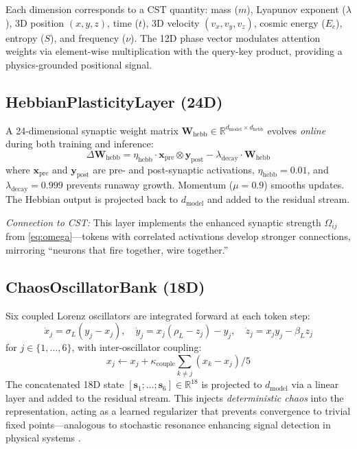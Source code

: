 \documentclass[11pt,a4paper]{article}
\begin{document}
Each dimension corresponds to a CST quantity: mass ($m$), Lyapunov exponent ($\lambda$), 3D position $(x,y,z)$, time ($t$), 3D velocity $(v_x, v_y, v_z)$, cosmic energy ($E_c$), entropy ($S$), and frequency ($\nu$). The 12D phase vector modulates attention weights via element-wise multiplication with the query-key product, providing a physics-grounded positional signal.

\subsection{HebbianPlasticityLayer (24D)}
\label{sec:hebbian}

A 24-dimensional synaptic weight matrix $\mathbf{W}_{\text{hebb}} \in \mathbb{R}^{d_{\text{model}} \times d_{\text{hebb}}}$ evolves \emph{online} during both training and inference:
\begin{equation}
    \Delta \mathbf{W}_{\text{hebb}} = \eta_{\text{hebb}} \cdot \mathbf{x}_{\text{pre}} \otimes \mathbf{y}_{\text{post}} - \lambda_{\text{decay}} \cdot \mathbf{W}_{\text{hebb}}
    \label{eq:hebb-update}
\end{equation}
where $\mathbf{x}_{\text{pre}}$ and $\mathbf{y}_{\text{post}}$ are pre- and post-synaptic activations, $\eta_{\text{hebb}} = 0.01$, and $\lambda_{\text{decay}} = 0.999$ prevents runaway growth. Momentum ($\mu = 0.9$) smooths updates. The Hebbian output is projected back to $d_{\text{model}}$ and added to the residual stream.

\emph{Connection to CST:} This layer implements the enhanced synaptic strength $\Omega_{ij}$ from \cref{eq:omega}---tokens with correlated activations develop stronger connections, mirroring ``neurons that fire together, wire together.''

\subsection{ChaosOscillatorBank (18D)}
\label{sec:chaos}

Six coupled Lorenz oscillators are integrated forward at each token step:
\begin{equation}
    \dot{x}_j = \sigma_L(y_j - x_j), \quad \dot{y}_j = x_j(\rho_L - z_j) - y_j, \quad \dot{z}_j = x_j y_j - \beta_L z_j
    \label{eq:lorenz}
\end{equation}
for $j \in \{1, \ldots, 6\}$, with inter-oscillator coupling:
\begin{equation}
    x_j \leftarrow x_j + \kappa_{\text{couple}} \sum_{k \neq j} (x_k - x_j) / 5
    \label{eq:coupling}
\end{equation}
The concatenated 18D state $[\mathbf{s}_1; \ldots; \mathbf{s}_6] \in \mathbb{R}^{18}$ is projected to $d_{\text{model}}$ via a linear layer and added to the residual stream. This injects \emph{deterministic chaos} into the representation, acting as a learned regularizer that prevents convergence to trivial fixed points---analogous to stochastic resonance enhancing signal detection in physical systems \citep{benzi1981mechanism}.
\end{document}
